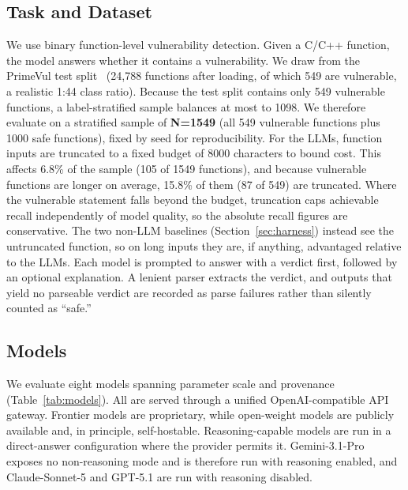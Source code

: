 \documentclass[computers,article,submit,moreauthors]{Definitions/mdpi}
\begin{document}
\subsection{Task and Dataset}
We use binary function-level vulnerability detection. Given a C/C++ function, the model answers whether it contains a vulnerability. We draw from the PrimeVul test split~\citep{primevul} (24{,}788 functions after loading, of which 549 are vulnerable, a realistic 1:44 class ratio). Because the test split contains only 549 vulnerable functions, a label-stratified sample balances at most to 1098. We therefore evaluate on a stratified sample of \textbf{N=1549} (all 549 vulnerable functions plus 1000 safe functions), fixed by seed for reproducibility. For the LLMs, function inputs are truncated to a fixed budget of 8000 characters to bound cost. This affects 6.8\% of the sample (105 of 1549 functions), and because vulnerable functions are longer on average, 15.8\% of them (87 of 549) are truncated. Where the vulnerable statement falls beyond the budget, truncation caps achievable recall independently of model quality, so the absolute recall figures are conservative. The two non-LLM baselines (Section~\ref{sec:harness}) instead see the untruncated function, so on long inputs they are, if anything, advantaged relative to the LLMs. Each model is prompted to answer with a verdict first, followed by an optional explanation. A lenient parser extracts the verdict, and outputs that yield no parseable verdict are recorded as parse failures rather than silently counted as ``safe.''

\subsection{Models}
We evaluate eight models spanning parameter scale and provenance (Table~\ref{tab:models}). All are served through a unified OpenAI-compatible API gateway. Frontier models are proprietary, while open-weight models are publicly available and, in principle, self-hostable. Reasoning-capable models are run in a direct-answer configuration where the provider permits it. Gemini-3.1-Pro exposes no non-reasoning mode and is therefore run with reasoning enabled, and Claude-Sonnet-5 and GPT-5.1 are run with reasoning disabled.
\end{document}
